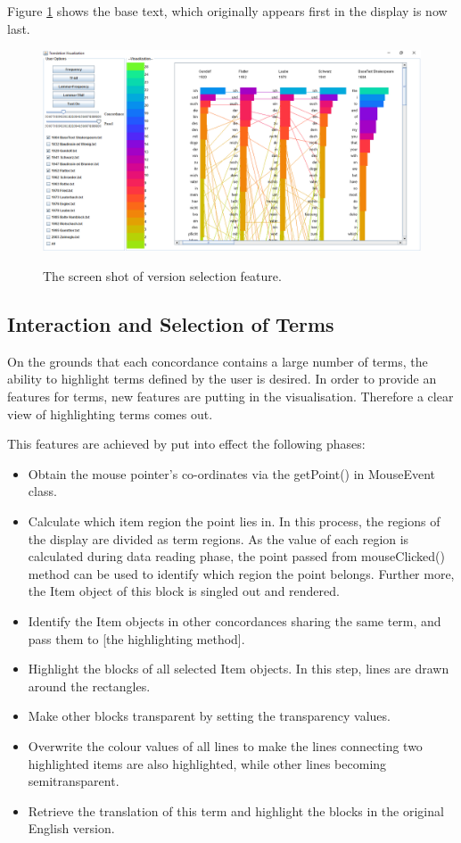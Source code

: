 Figure \ref{fig:versionChoosDemo} shows the base text, which originally appears first in the display is now last.

\begin{figure}[H]
	\centering	
	\includegraphics[width=\textwidth]{Figs/Version-Selecting-Demo}\\[1ex]
	\caption{The screen shot of version selection feature.}
	\label{fig:versionChoosDemo}
\end{figure} 

\subsection{Interaction and Selection of Terms}

On the grounds that each concordance contains a large number of terms, the ability to highlight terms defined by the user is desired.  In order to provide an features for terms, new features are putting in the visualisation. Therefore a clear view of highlighting terms comes out. 

This features are achieved by put into effect the following phases:
\begin{itemize}
	\item \textbf{} Obtain the mouse pointer’s co-ordinates via the getPoint() in MouseEvent class.
	\item \textbf{} Calculate which item region the point lies in. In this process, the regions of the display are divided as term regions. As the value of each region is calculated during data reading phase, the point passed from mouseClicked() method can be used to identify which region the point belongs. Further more, the Item object of this block is singled out and rendered. 
	\item \textbf{} Identify the Item objects in other concordances sharing the same term, and pass them to [the highlighting method].
	\item \textbf{} Highlight the blocks of all selected Item objects. In this step, lines are drawn around the rectangles. 
	\item \textbf{} Make other blocks transparent by setting the transparency values. 
	\item \textbf{} Overwrite the colour values of all lines to make the lines connecting two highlighted items are also highlighted, while other lines becoming semitransparent.
	\item \textbf{} Retrieve the translation of this term and highlight the blocks in the original English version.	
\end{itemize}

